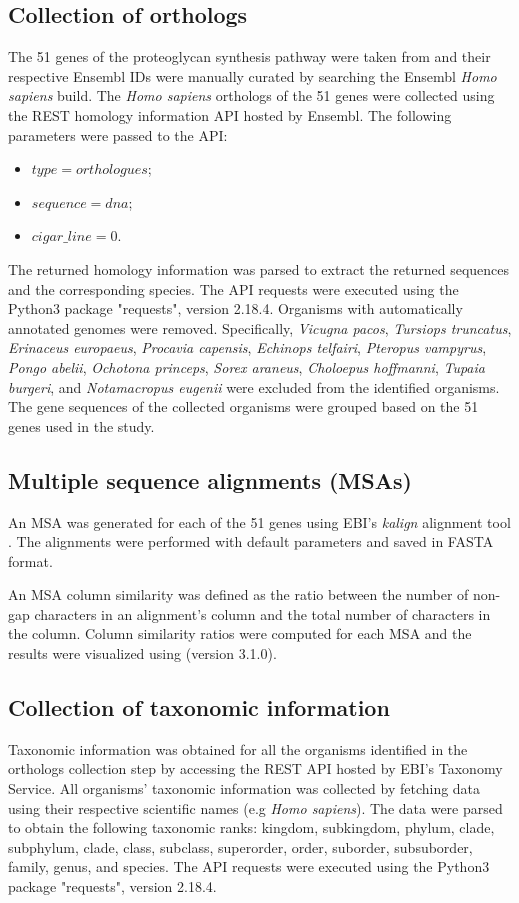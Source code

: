 \documentclass{article}
\begin{document}
\subsection*{Collection of orthologs}
The 51 genes of the proteoglycan synthesis pathway were taken from \cite{pg_chapter} and their respective Ensembl IDs were manually curated by searching the Ensembl \textit{Homo sapiens} build. The \textit{Homo sapiens} orthologs of the 51 genes were collected using the REST homology information API hosted by Ensembl. The following parameters were passed to the API:
\begin{itemize}
	\item $type=orthologues$;
	\item $sequence=dna$;
	\item $cigar\_line=0$.
\end{itemize}
The returned homology information was parsed to extract the returned sequences and the corresponding species. The API requests were executed using the Python3 package "requests", version 2.18.4. Organisms with automatically annotated genomes were removed. Specifically, \textit{Vicugna pacos}, \textit{Tursiops truncatus}, \textit{Erinaceus europaeus}, \textit{Procavia capensis}, \textit{Echinops telfairi}, \textit{Pteropus vampyrus}, \textit{Pongo abelii}, \textit{Ochotona princeps}, \textit{Sorex araneus}, \textit{Choloepus hoffmanni}, \textit{Tupaia burgeri}, and \textit{Notamacropus eugenii} were excluded from the identified organisms. The gene sequences of the collected organisms were grouped based on the 51 genes used in the study. 

\subsection*{Multiple sequence alignments (MSAs)}
An MSA was generated for each of the 51 genes using EBI's \textit{kalign} alignment tool \cite{kalign}. The alignments were performed with default parameters and saved in FASTA format.

An MSA column similarity was defined as the ratio between the number of non-gap characters in an alignment's column and the total number of characters in the column. Column similarity ratios were computed for each MSA and the results were visualized using \cite{matplotlib} (version 3.1.0).

\subsection*{Collection of taxonomic information}
Taxonomic information was obtained for all the organisms identified in the orthologs collection step by accessing the REST API hosted by EBI's Taxonomy Service. All organisms' taxonomic information was collected by fetching data using their respective scientific names (e.g \textit{Homo sapiens}). The data were parsed to obtain the following taxonomic ranks: kingdom, subkingdom, phylum, clade, subphylum, clade, class, subclass, superorder, order, suborder, subsuborder, family, genus, and species. The API requests were executed using the Python3 package "requests", version 2.18.4.
\end{document}
